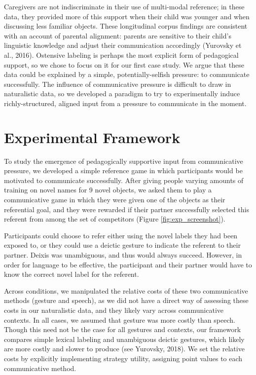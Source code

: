 \documentclass[english,,man,floatsintext]{apa6}
\begin{document}
Caregivers are not indiscriminate in their use of multi-modal reference; in these data, they provided more of this support when their child was younger and when discussing less familiar objects. These longitudinal corpus findings are consistent with an account of parental alignment: parents are sensitive to their child's linguistic knowledge and adjust their communication accordingly (Yurovsky et al., 2016). Ostensive labeling is perhaps the most explicit form of pedagogical support, so we chose to focus on it for our first case study. We argue that these data could be explained by a simple, potentially-selfish pressure: to communicate successfully. The influence of communicative pressure is difficult to draw in naturalistic data, so we developed a paradigm to try to experimentally induce richly-structured, aligned input from a pressure to communicate in the moment.

\hypertarget{experimental-framework}{%
\section{Experimental Framework}\label{experimental-framework}}

To study the emergence of pedagogically supportive input from communicative pressure, we developed a simple reference game in which participants would be motivated to communicate successfully. After giving people varying amounts of training on novel names for 9 novel objects, we asked them to play a communicative game in which they were given one of the objects as their referential goal, and they were rewarded if their partner successfully selected this referent from among the set of competitors (Figure \ref{fig:exp_screenshot}).

Participants could choose to refer either using the novel labels they had been exposed to, or they could use a deictic gesture to indicate the referent to their partner. Deixis was unambiguous, and thus would always succeed. However, in order for language to be effective, the participant and their partner would have to know the correct novel label for the referent.

Across conditions, we manipulated the relative costs of these two communicative methods (gesture and speech), as we did not have a direct way of assessing these costs in our naturalistic data, and they likely vary across communicative contexts. In all cases, we assumed that gesture was more costly than speech. Though this need not be the case for all gestures and contexts, our framework compares simple lexical labeling and unambiguous deictic gestures, which likely are more costly and slower to produce (see Yurovsky, 2018). We set the relative costs by explicitly implementing strategy utility, assigning point values to each communicative method.
\end{document}
